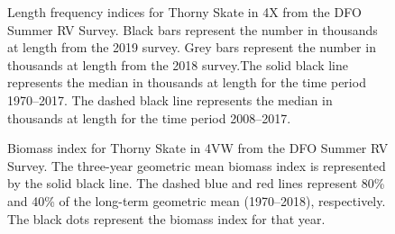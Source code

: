 \documentclass[11pt]{book}
\begin{document}
\begin{figure}[htb]

{\centering {} 

}

\caption{Length frequency indices for Thorny Skate in 4X from the DFO Summer RV Survey. Black bars represent the number in thousands at length from the 2019 survey. Grey bars represent the number in thousands at length from the 2018 survey.The solid black line represents the median in thousands at length for the time period 1970--2017. The dashed black line represents the median in thousands at length for the time period 2008--2017.}\label{fig:87-fig-thornyskate-lengthfreq4X}
\end{figure}

\begin{figure}[htb]

{\centering {} 

}

\caption{Biomass index for Thorny Skate in 4VW from the DFO Summer RV Survey. The three-year geometric mean biomass index is represented by the solid black line. The dashed blue and red lines represent 80\% and 40\% of the long-term geometric mean (1970--2018), respectively. The black dots represent the biomass index for that year.}\label{fig:88-fig-thornyskate-biomass4VW}
\end{figure}
\end{document}
